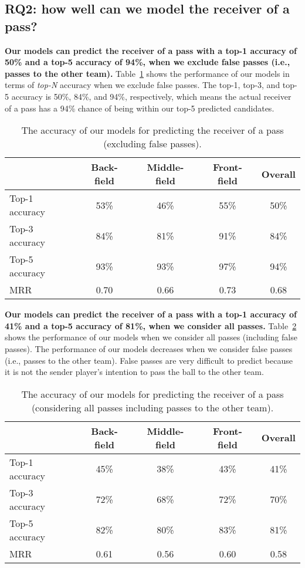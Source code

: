 \subsection{RQ2: how well can we model the receiver of a pass?}\label{RQ2-results}

\textbf{Our models can predict the receiver of a pass with a top-1 accuracy of 50\% and a top-5 accuracy of 94\%, when we exclude false passes (i.e., passes to the other team).}
Table~\ref{tab:performance-accurate-passes} shows the performance of our models in terms of \textit{top-N} accuracy when we exclude false passes. 
The top-1, top-3, and top-5 accuracy is 50\%, 84\%, and 94\%, respectively, which means the actual receiver of a pass has a 94\% chance of being within our top-5 predicted candidates.

\begin{table}[!t]
\caption{The accuracy of our models for predicting the receiver of a pass (excluding false passes).}
\centering
\begin{tabular}{lcccc}
  \hline
  & Back-field & Middle-field & Front-field & Overall \\
  \hline
  Top-1 accuracy & 53\% & 46\% & 55\% & 50\% \\
  Top-3 accuracy & 84\% & 81\% & 91\% & 84\% \\
  Top-5 accuracy & 93\% & 93\% & 97\% & 94\% \\
  MRR & 0.70 & 0.66 & 0.73 & 0.68 \\
  \hline
\end{tabular}
\label{tab:performance-accurate-passes}
\end{table}

\textbf{Our models can predict the receiver of a pass with a top-1 accuracy of 41\% and a top-5 accuracy of 81\%, when we consider all passes.}
Table~\ref{tab:performance-all-passes} shows the performance of our models when we consider all passes (including false passes). 
The performance of our models decreases when we consider false passes (i.e., passes to the other team). 
False passes are very difficult to predict because it is not the sender player's intention to pass the ball to the other team. 

\begin{table}[!t]
\caption{The accuracy of our models for predicting the receiver of a pass (considering all passes including passes to the other team).}
\centering
\begin{tabular}{lcccc}
  \hline
  & Back-field & Middle-field & Front-field & Overall \\
  \hline
  Top-1 accuracy & 45\% & 38\% & 43\% & 41\% \\
  Top-3 accuracy & 72\% & 68\% & 72\% & 70\% \\
  Top-5 accuracy & 82\% & 80\% & 83\% & 81\% \\
  MRR & 0.61 & 0.56 & 0.60 & 0.58 \\
  \hline
\end{tabular}
\label{tab:performance-all-passes}
\end{table}

